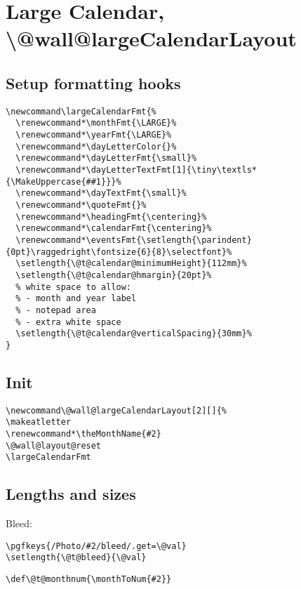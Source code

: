 \documentclass[11pt,oneside]{memoir-article}
\begin{document}
\section{Large Calendar, \textbackslash @wall@largeCalendarLayout}
\label{sec:orge83428f}
\subsection{Setup formatting hooks}
\label{sec:org03aaf31}

\begin{verbatim}
\newcommand\largeCalendarFmt{%
  \renewcommand*\monthFmt{\LARGE}%
  \renewcommand*\yearFmt{\LARGE}%
  \renewcommand*\dayLetterColor{}%
  \renewcommand*\dayLetterFmt{\small}%
  \renewcommand*\dayLetterTextFmt[1]{\tiny\textls*{\MakeUppercase{##1}}}%
  \renewcommand*\dayTextFmt{\small}%
  \renewcommand*\quoteFmt{}%
  \renewcommand*\headingFmt{\centering}%
  \renewcommand*\calendarFmt{\centering}%
  \renewcommand*\eventsFmt{\setlength{\parindent}{0pt}\raggedright\fontsize{6}{8}\selectfont}%
  \setlength{\@t@calendar@minimumHeight}{112mm}%
  \setlength{\@t@calendar@hmargin}{20pt}%
  % white space to allow:
  % - month and year label
  % - notepad area
  % - extra white space
  \setlength{\@t@calendar@verticalSpacing}{30mm}%
}
\end{verbatim}

\subsection{Init}
\label{sec:orgd0c393b}

\begin{verbatim}
\newcommand\@wall@largeCalendarLayout[2][]{%
\makeatletter
\renewcommand*\theMonthName{#2}
\@wall@layout@reset
\largeCalendarFmt
\end{verbatim}

\subsection{Lengths and sizes}
\label{sec:org8061ef0}

Bleed:

\begin{verbatim}
\pgfkeys{/Photo/#2/bleed/.get=\@val}
\setlength{\@t@bleed}{\@val}
\end{verbatim}

\begin{verbatim}
\def\@t@monthnum{\monthToNum{#2}}
\end{verbatim}
\end{document}
